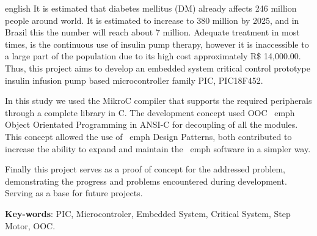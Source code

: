 \documentclass[	12pt, Times, openright, twoside, a4paper, english, brazil]{abntex2}
\begin{document}
\begin{resumo}[Abstract]
\begin{otherlanguage*}{english}
It is estimated that diabetes mellitus (DM) already affects 246 million people around world. It is estimated to increase to 380 million by 2025, and in Brazil this the number will reach about 7 million. Adequate treatment in most times, is the continuous use of insulin pump therapy, however it is inaccessible to a large part of the population due to its high cost approximately R\$ 14,000.00. Thus, this project aims to develop an embedded system critical control prototype insulin infusion pump based microcontroller family PIC, PIC18F452. 

In this study we used the MikroC compiler that supports the required peripherals through a complete library in C. The development concept used OOC \ emph {Object Orientated Programming in ANSI-C} for decoupling of all the modules. This concept allowed the use of \ emph {Design Patterns}, both contributed to increase the ability to expand and maintain the \ emph {software} in a simpler way. 

Finally this project serves as a proof of concept for the addressed problem, demonstrating the progress and problems encountered during development. Serving as a base for future projects.

   \vspace{\onelineskip}
 
   \noindent 
   \textbf{Key-words}: PIC, Microcontroler, Embedded System, Critical System, Step Motor, OOC.
\end{otherlanguage*}
\end{resumo}

\listoffigures*
\cleardoublepage

\listoftables*
\cleardoublepage
\end{document}
